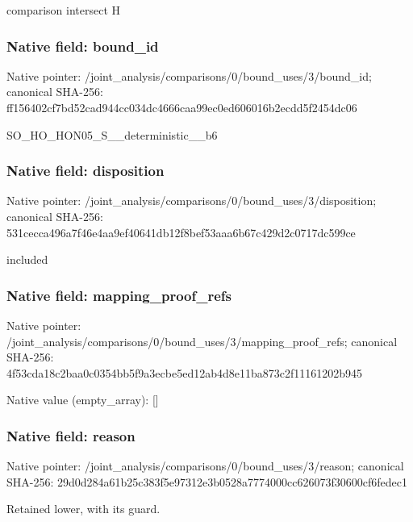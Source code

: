 \documentclass[10pt,a4paper]{article}
\begin{document}
\begingroup\raggedright\sloppy comparison intersect H\par\endgroup

\subsubsection{Native field: bound\_\allowbreak{}id}
Native pointer: /joint\_\allowbreak{}analysis/comparisons/0/bound\_\allowbreak{}uses/3/bound\_\allowbreak{}id; canonical SHA-256: ff156402cf7bd52cad944cc034dc4666caa99ec0ed606016b2ecdd5f2454dc06

\begingroup\raggedright\sloppy SO\_\allowbreak{}HO\_\allowbreak{}HON05\_\allowbreak{}S\_\allowbreak{}\_\allowbreak{}deterministic\_\allowbreak{}\_\allowbreak{}b6\par\endgroup

\subsubsection{Native field: disposition}
Native pointer: /joint\_\allowbreak{}analysis/comparisons/0/bound\_\allowbreak{}uses/3/disposition; canonical SHA-256: 531cecca496a7f46e4aa9ef40641db12f8bef53aaa6b67c429d2c0717dc599ce

\begingroup\raggedright\sloppy included\par\endgroup

\subsubsection{Native field: mapping\_\allowbreak{}proof\_\allowbreak{}refs}
Native pointer: /joint\_\allowbreak{}analysis/comparisons/0/bound\_\allowbreak{}uses/3/mapping\_\allowbreak{}proof\_\allowbreak{}refs; canonical SHA-256: 4f53cda18c2baa0c0354bb5f9a3ecbe5ed12ab4d8e11ba873c2f11161202b945

Native value (empty\_\allowbreak{}array): []

\subsubsection{Native field: reason}
Native pointer: /joint\_\allowbreak{}analysis/comparisons/0/bound\_\allowbreak{}uses/3/reason; canonical SHA-256: 29d0d284a61b25c383f5e97312e3b0528a7774000cc626073f30600cf6fedec1

\begingroup\raggedright\sloppy Retained lower,\allowbreak{} with its guard.\par\endgroup
\end{document}
